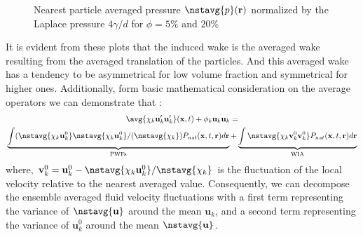 \begin{figure}[h!]
    \caption{Nearest particle averaged pressure $\nstavg{p}(\textbf{r})$ normalized by the Laplace pressure $4 \gamma /d$ for  $\phi = 5\%$ and $20\%$}  
    \label{fig:Stream}
\end{figure}
It is evident from these plots that the induced wake is the averaged wake resulting from the averaged translation of the particles. 
And this averaged wake has a tendency to be asymmetrical for low volume fraction and symmetrical for higher ones. 
Additionally, form basic mathematical consideration on the average operators we can demonstrate that :
\begin{multline*}
    \avg{\chi_k \textbf{u}'_k\textbf{u}'_k}(\textbf{x},t)
    + \phi_k \textbf{u}_k\textbf{u}_k
    = \\
    \underbrace{\int (\nstavg{\chi_k \textbf{u}^0_k}  \nstavg{\chi_k \textbf{u}^0_k} / (\nstavg{\chi_k})  P_{nst}(\textbf{x},t,\textbf{r}) d\textbf{r} }_\text{PWFs}
    +\underbrace{\int \nstavg{\chi_k \textbf{v}_k^0\textbf{v}_k^0}  P_{nst}(\textbf{x},t,\textbf{r}) d\textbf{r}}_\text{WIA}
    \label{eq:def_uu}
\end{multline*}
where, $\textbf{v}_k^0  = \textbf{u}_k^0 - \nstavg{\chi_k \textbf{u}^0_k} / \nstavg{\chi_k}$ is the fluctuation of the local velocity relative to the nearest averaged value. 
Consequently, we can decompose the ensemble averaged fluid velocity fluctuations with a first term representing the variance of $\nstavg{\textbf{u}}$ around the mean $\textbf{u}_k$, and a second term representing the variance of $\textbf{u}^0_k$ around the mean  $\nstavg{\textbf{u}}$. 

